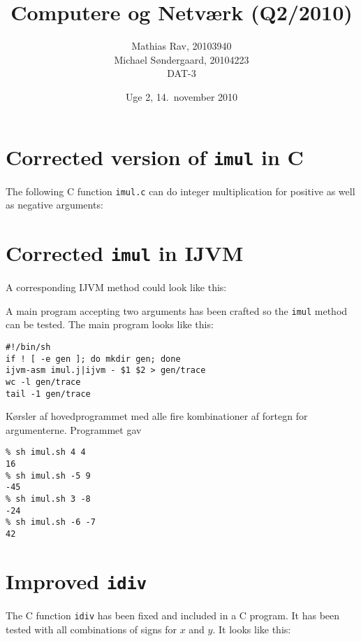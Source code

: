 \documentclass[12pt,a4paper]{article}
\title{Computere og Netværk (Q2/2010)}
\author{Mathias Rav, 20103940 \\
		Michael Søndergaard, 20104223 \\
		DAT-3}
\date{Uge 2, 14.\ november 2010}
\newcommand{\imul}{\texttt{imul}}
\begin{document}
\maketitle

\section{Corrected version of \imul{} in C}

The following C function \texttt{imul.c} can do integer multiplication for
positive as well as negative arguments:

\lstset{language=C}


\section{Corrected \imul{} in IJVM}

A corresponding IJVM method could look like this:

\lstset{language=JVMIS}


A main program accepting two arguments has been crafted so the \texttt{imul}
method can be tested. The main program looks like this:

\lstset{language=sh}
\begin{lstlisting}
#!/bin/sh
if ! [ -e gen ]; do mkdir gen; done
ijvm-asm imul.j|ijvm - $1 $2 > gen/trace
wc -l gen/trace
tail -1 gen/trace
\end{lstlisting}

\clearpage

Kørsler af hovedprogrammet med alle fire kombinationer af fortegn for argumenterne. Programmet gav

\lstset{language=sh,numbers=none}
\begin{lstlisting}
% sh imul.sh 4 4
16
% sh imul.sh -5 9
-45
% sh imul.sh 3 -8
-24
% sh imul.sh -6 -7
42
\end{lstlisting}

\section{Improved \texttt{idiv}}

The C function \texttt{idiv} has been fixed and included in a C program. It has
been tested with all combinations of signs for $x$ and $y$. It looks like this:

\lstset{language=C,numbers=left}

\end{document}
